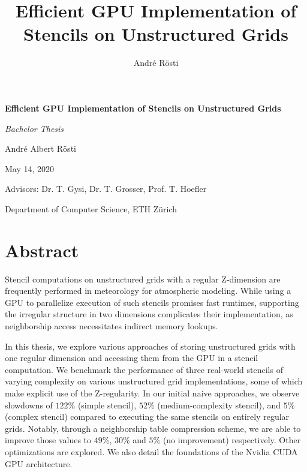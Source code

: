 \documentclass[a4paper, 11pt, oneside]{book}
\title{Efficient GPU Implementation of Stencils on Unstructured Grids}
\author{André Rösti}
\begin{document}
\begin{titlepage}
	\begin{center}
		\vspace*{2cm}
		{\Huge \textbf{Efficient GPU Implementation of Stencils on Unstructured Grids}}
		\vspace{2cm}
		
		{\Large \textit{Bachelor Thesis}}
		\vspace{2cm}
		
		André Albert Rösti
		
		May 14, 2020
	\end{center}
	\vfill
	\raggedleft Advisors: Dr. T. Gysi, Dr. T. Grosser, Prof. T. Hoefler
		
	\raggedleft Department of Computer Science, ETH Zürich
	\vspace*{2cm}
\end{titlepage}
\restoregeometry

\thispagestyle{empty}

\tableofcontents

\chapter*{Abstract}

Stencil computations on unstructured grids with a regular Z-dimension are frequently performed in meteorology for atmospheric modeling. While using a GPU to parallelize execution of such stencils promises fast runtimes, supporting the irregular structure in two dimensions complicates their implementation, as neighborship access necessitates indirect memory lookups.

In this thesis, we explore various approaches of storing unstructured grids with one regular dimension and accessing them from the GPU in a stencil computation. We benchmark the performance of three real-world stencils of varying complexity on various unstructured grid implementations, some of which make explicit use of the Z-regularity. In our initial naive approaches, we observe slowdowns of $122\%$ (simple stencil), $52\%$ (medium-complexity stencil), and $5\%$ (complex stencil) compared to executing the same stencils on entirely regular grids. Notably, through a neighborship table compression scheme, we are able to improve those values to $49\%$, $30\%$ and $5\%$ (no improvement) respectively. Other optimizations are explored. We also detail the foundations of the Nvidia CUDA GPU architecture.















\printbibliography
\end{document}
